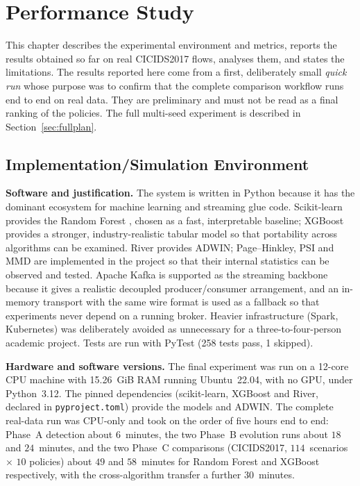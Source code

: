 \documentclass{article}
\begin{document}
\pagebreak
	\section{Performance Study}

This chapter describes the experimental environment and metrics, reports the results obtained so far on real CICIDS2017 flows, analyses them, and states the limitations. The results reported here come from a first, deliberately small \emph{quick run} whose purpose was to confirm that the complete comparison workflow runs end to end on real data. They are preliminary and must not be read as a final ranking of the policies. The full multi-seed experiment is described in Section~\ref{sec:fullplan}.

	\subsection{Implementation/Simulation Environment}

\textbf{Software and justification.} The system is written in Python because it has the dominant ecosystem for machine learning and streaming glue code. Scikit-learn provides the Random Forest \cite{breiman2001rf}, chosen as a fast, interpretable baseline; XGBoost \cite{chen2016xgboost} provides a stronger, industry-realistic tabular model so that portability across algorithms can be examined. River \cite{montiel2021river} provides ADWIN; Page--Hinkley, PSI and MMD are implemented in the project so that their internal statistics can be observed and tested. Apache Kafka is supported as the streaming backbone because it gives a realistic decoupled producer/consumer arrangement, and an in-memory transport with the same wire format is used as a fallback so that experiments never depend on a running broker. Heavier infrastructure (Spark, Kubernetes) was deliberately avoided as unnecessary for a three-to-four-person academic project. Tests are run with PyTest (258 tests pass, 1 skipped).

\textbf{Hardware and software versions.} The final experiment was run on a 12-core CPU machine with 15.26~GiB RAM running Ubuntu~22.04, with no GPU, under Python~3.12. The pinned dependencies (scikit-learn, XGBoost and River, declared in \texttt{pyproject.toml}) provide the models and ADWIN. The complete real-data run was CPU-only and took on the order of five hours end to end: Phase~A detection about $6$~minutes, the two Phase~B evolution runs about $18$ and $24$~minutes, and the two Phase~C comparisons (CICIDS2017, $114$~scenarios $\times$ $10$ policies) about $49$ and $58$~minutes for Random Forest and XGBoost respectively, with the cross-algorithm transfer a further $30$~minutes.
\end{document}
